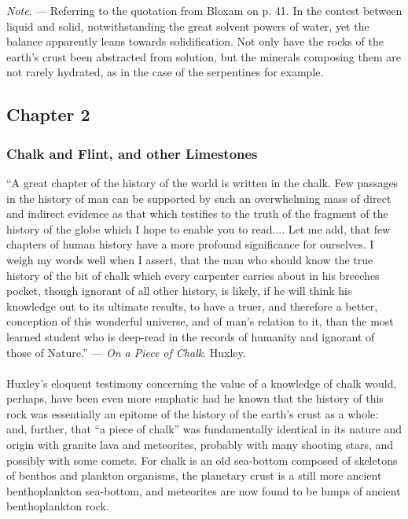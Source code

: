 \documentclass[a4paper, 12pt, oneside, landscape]{article}
\begin{document}
\emph{Note}. --- Referring to the quotation from Bloxam on p. 41. In the contest between liquid and solid, notwithstanding the great solvent powers of water, yet the balance apparently leans towards solidification. Not only have the rocks of the earth's crust been abstracted from solution, but the minerals composing them are not rarely hydrated, as in the case of the serpentines for example.
\clearpage
\subsection{Chapter 2}
\subsubsection{Chalk and Flint, and other Limestones}
\begin{displayquote}
``A great chapter of the history of the world is written in the chalk. Few passages in the history of man can be supported by such an overwhelming mass of direct and indirect evidence as that which testifies to the truth of the fragment of the history of the globe which I hope to enable you to read.... Let me add, that few chapters of human history have a more profound significance for ourselves. I weigh my words well when I assert, that the man who should know the true history of the bit of chalk which every carpenter carries about in his breeches pocket, though ignorant of all other history, is likely, if he will think his knowledge out to its ultimate results, to have a truer, and therefore a better, conception of this wonderful universe, and of man's relation to it, than the most learned student who is deep-read in the records of humanity and ignorant of those of Nature.'' --- \emph{On a Piece of Chalk}. Huxley.
\end{displayquote}
\paragraph{}
Huxley's eloquent testimony concerning the value of a knowledge of chalk would, perhaps, have been even more emphatic had he known that the history of this rock was essentially an epitome of the history of the earth's crust as a whole: and, further, that ``a piece of chalk'' was fundamentally identical in its nature and origin with granite lava and meteorites, probably with many shooting stars, and possibly with some comets. For chalk is an old sea-bottom composed of skeletons of benthos and plankton organisms, the planetary crust is a still more ancient benthoplankton sea-bottom, and meteorites are now found to be lumps of ancient benthoplankton rock.
\end{document}
